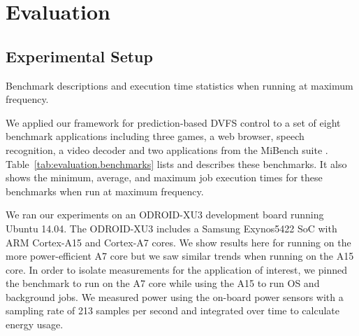 \section{Evaluation}
\label{sec:evaluation}

\subsection{Experimental Setup}
\label{sec:evaluation.setup}

\begin{table}
  \begin{center}
    \begin{small}
    
    \end{small}
    \caption{Benchmark descriptions and execution time statistics when running at maximum frequency.}
    \label{tab:evaluation.benchmarks}
  \end{center}
\end{table}

We applied our framework for prediction-based DVFS control to a set of eight benchmark
applications including three games, a web browser, speech recognition, a video decoder and
two applications from the MiBench suite \cite{mibench}.
Table~\ref{tab:evaluation.benchmarks} lists and describes these benchmarks.
It also shows the minimum, average, and maximum
job execution times for these benchmarks when run at maximum frequency.

We ran our experiments on an ODROID-XU3 \cite{odroid} development board running
Ubuntu 14.04. The ODROID-XU3 includes a Samsung Exynos5422 SoC with ARM
Cortex-A15 and Cortex-A7 cores. We show results here for running on the more
power-efficient A7 core but we saw similar trends when running on the A15
core. In order to isolate measurements for the application of interest, we
pinned the benchmark to run on the A7 core while using the A15 to run OS and
background jobs. We measured power using the on-board power sensors with a
sampling rate of 213 samples per second and integrated over time to calculate
energy usage.

